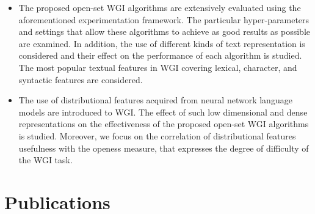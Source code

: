 \begin{itemize}
\item The proposed open-set WGI algorithms are extensively evaluated using the aforementioned experimentation framework. The particular hyper-parameters and settings that allow these algorithms to achieve as good results as possible are examined. In addition, the use of different kinds of text representation is considered and their effect on the performance of each algorithm is studied. The most popular textual features in WGI covering lexical, character, and syntactic features are considered.
\item The use of distributional features acquired from neural network language models are introduced to WGI. The effect of such low dimensional and dense representations on the effectiveness of the proposed open-set WGI algorithms is studied. Moreover, we focus on the correlation of distributional features usefulness with the openess measure, that expresses the degree of difficulty of the WGI task.


\end{itemize}

\section{Publications}


